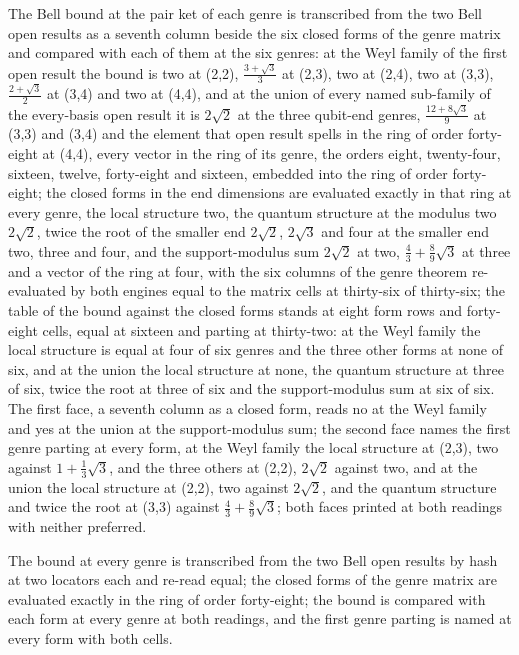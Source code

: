 \begin{chtable}
The Bell bound at the pair ket of each genre is transcribed from the two Bell open results as a seventh column beside the six closed forms of the genre matrix and compared with each of them at the six genres: at the Weyl family of the first open result the bound is two at (2,2), $\tfrac{3 + \sqrt{3}}{3}$ at (2,3), two at (2,4), two at (3,3), $\tfrac{2 + \sqrt{3}}{2}$ at (3,4) and two at (4,4), and at the union of every named sub-family of the every-basis open result it is $2\sqrt{2}$ at the three qubit-end genres, $\tfrac{12 + 8\sqrt{3}}{9}$ at (3,3) and (3,4) and the element that open result spells in the ring of order forty-eight at (4,4), every vector in the ring of its genre, the orders eight, twenty-four, sixteen, twelve, forty-eight and sixteen, embedded into the ring of order forty-eight; the closed forms in the end dimensions are evaluated exactly in that ring at every genre, the local structure two, the quantum structure at the modulus two $2\sqrt{2}$, twice the root of the smaller end $2\sqrt{2}$, $2\sqrt{3}$ and four at the smaller end two, three and four, and the support-modulus sum $2\sqrt{2}$ at two, $\tfrac{4}{3} + \tfrac{8}{9}\sqrt{3}$ at three and a vector of the ring at four, with the six columns of the genre theorem re-evaluated by both engines equal to the matrix cells at thirty-six of thirty-six; the table of the bound against the closed forms stands at eight form rows and forty-eight cells, equal at sixteen and parting at thirty-two: at the Weyl family the local structure is equal at four of six genres and the three other forms at none of six, and at the union the local structure at none, the quantum structure at three of six, twice the root at three of six and the support-modulus sum at six of six. The first face, a seventh column as a closed form, reads no at the Weyl family and yes at the union at the support-modulus sum; the second face names the first genre parting at every form, at the Weyl family the local structure at (2,3), two against $1 + \tfrac{1}{3}\sqrt{3}$, and the three others at (2,2), $2\sqrt{2}$ against two, and at the union the local structure at (2,2), two against $2\sqrt{2}$, and the quantum structure and twice the root at (3,3) against $\tfrac{4}{3} + \tfrac{8}{9}\sqrt{3}$; both faces printed at both readings with neither preferred.
\end{chtable}
\chdeps{}{}
The bound at every genre is transcribed from the two Bell open results by hash at two locators each and re-read equal; the closed forms of the genre matrix are evaluated exactly in the ring of order forty-eight; the bound is compared with each form at every genre at both readings, and the first genre parting is named at every form with both cells.


